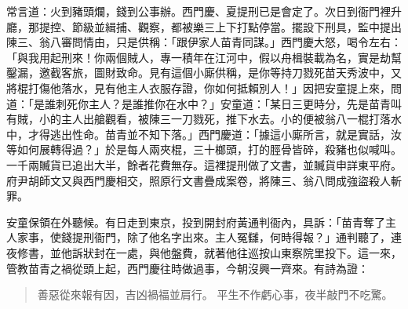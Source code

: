 常言道：火到豬頭爛，錢到公事辦。西門慶、夏提刑已是會定了。次日到衙門裡升廳，那提控、節級並緝捕、觀察，都被樂三上下打點停當。擺設下刑具，監中提出陳三、翁八審問情由，只是供稱：「跟伊家人苗青同謀。」西門慶大怒，喝令左右：「與我用起刑來！你兩個賊人，專一積年在江河中，假以舟楫裝載為名，實是劫幫鑿漏，邀截客旅，圖財致命。見有這個小廝供稱，是你等持刀戮死苗天秀波中，又將棍打傷他落水，見有他主人衣服存證，你如何抵賴別人！」因把安童提上來，問道：「是誰刺死你主人？是誰推你在水中？」安童道：「某日三更時分，先是苗青叫有賊，小的主人出艙觀看，被陳三一刀戮死，推下水去。小的便被翁八一棍打落水中，才得逃出性命。苗青並不知下落。」西門慶道：「據這小廝所言，就是實話，汝等如何展轉得過？」於是每人兩夾棍，三十榔頭，打的脛骨皆碎，殺豬也似喊叫。一千兩贓貨已追出大半，餘者花費無存。這裡提刑做了文書，並贓貨申詳東平府。府尹胡師文又與西門慶相交，照原行文書疊成案卷，將陳三、翁八問成強盜殺人斬罪。

安童保領在外聽候。有日走到東京，投到開封府黃通判衙內，具訴：「苗青奪了主人家事，使錢提刑衙門，除了他名字出來。主人冤讎，何時得報？」通判聽了，連夜修書，並他訴狀封在一處，與他盤費，就著他往巡按山東察院里投下。這一來，管教苗青之禍從頭上起，西門慶往時做過事，今朝沒興一齊來。有詩為證：
\begin{quote}
善惡從來報有因，吉凶禍福並肩行。
平生不作虧心事，夜半敲門不吃驚。
\end{quote}
